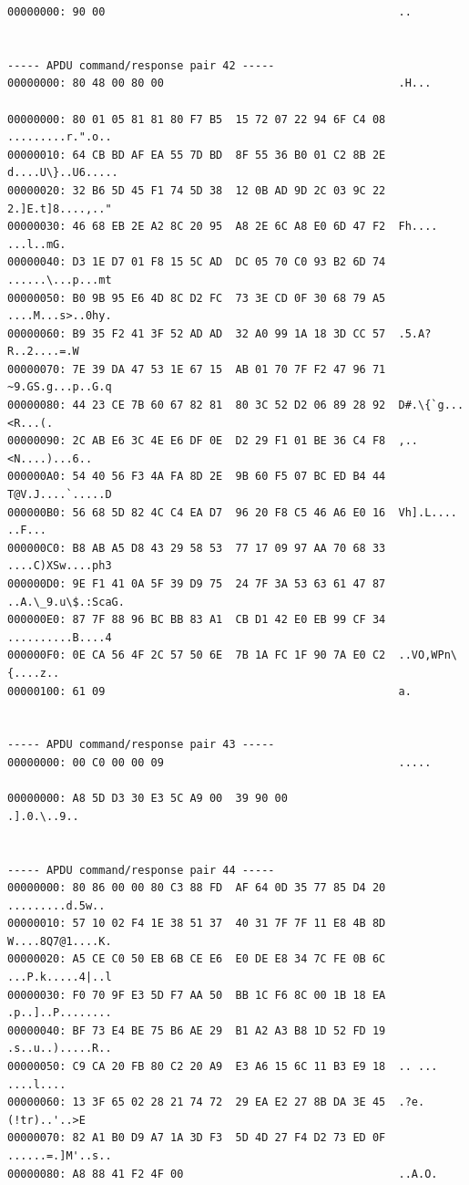 \documentclass[bsc,frontabs,twoside,singlespacing,parskip,deptreport]{infthesis}     %
\begin{document}
\begin{appendices}
\begin{Verbatim}[commandchars=\\\{\}, fontsize=\small]
00000000: 90 00                                             ..


----- APDU command/response pair 42 -----
00000000: 80 48 00 80 00                                    .H...

00000000: 80 01 05 81 81 80 F7 B5  15 72 07 22 94 6F C4 08  .........r.".o..
00000010: 64 CB BD AF EA 55 7D BD  8F 55 36 B0 01 C2 8B 2E  d....U\}..U6.....
00000020: 32 B6 5D 45 F1 74 5D 38  12 0B AD 9D 2C 03 9C 22  2.]E.t]8....,.."
00000030: 46 68 EB 2E A2 8C 20 95  A8 2E 6C A8 E0 6D 47 F2  Fh.... ...l..mG.
00000040: D3 1E D7 01 F8 15 5C AD  DC 05 70 C0 93 B2 6D 74  ......\...p...mt
00000050: B0 9B 95 E6 4D 8C D2 FC  73 3E CD 0F 30 68 79 A5  ....M...s>..0hy.
00000060: B9 35 F2 41 3F 52 AD AD  32 A0 99 1A 18 3D CC 57  .5.A?R..2....=.W
00000070: 7E 39 DA 47 53 1E 67 15  AB 01 70 7F F2 47 96 71  ~9.GS.g...p..G.q
00000080: 44 23 CE 7B 60 67 82 81  80 3C 52 D2 06 89 28 92  D#.\{`g...<R...(.
00000090: 2C AB E6 3C 4E E6 DF 0E  D2 29 F1 01 BE 36 C4 F8  ,..<N....)...6..
000000A0: 54 40 56 F3 4A FA 8D 2E  9B 60 F5 07 BC ED B4 44  T@V.J....`.....D
000000B0: 56 68 5D 82 4C C4 EA D7  96 20 F8 C5 46 A6 E0 16  Vh].L.... ..F...
000000C0: B8 AB A5 D8 43 29 58 53  77 17 09 97 AA 70 68 33  ....C)XSw....ph3
000000D0: 9E F1 41 0A 5F 39 D9 75  24 7F 3A 53 63 61 47 87  ..A.\_9.u\$.:ScaG.
000000E0: 87 7F 88 96 BC BB 83 A1  CB D1 42 E0 EB 99 CF 34  ..........B....4
000000F0: 0E CA 56 4F 2C 57 50 6E  7B 1A FC 1F 90 7A E0 C2  ..VO,WPn\{....z..
00000100: 61 09                                             a.


----- APDU command/response pair 43 -----
00000000: 00 C0 00 00 09                                    .....

00000000: A8 5D D3 30 E3 5C A9 00  39 90 00                 .].0.\..9..


----- APDU command/response pair 44 -----
00000000: 80 86 00 00 80 C3 88 FD  AF 64 0D 35 77 85 D4 20  .........d.5w.. 
00000010: 57 10 02 F4 1E 38 51 37  40 31 7F 7F 11 E8 4B 8D  W....8Q7@1....K.
00000020: A5 CE C0 50 EB 6B CE E6  E0 DE E8 34 7C FE 0B 6C  ...P.k.....4|..l
00000030: F0 70 9F E3 5D F7 AA 50  BB 1C F6 8C 00 1B 18 EA  .p..]..P........
00000040: BF 73 E4 BE 75 B6 AE 29  B1 A2 A3 B8 1D 52 FD 19  .s..u..).....R..
00000050: C9 CA 20 FB 80 C2 20 A9  E3 A6 15 6C 11 B3 E9 18  .. ... ....l....
00000060: 13 3F 65 02 28 21 74 72  29 EA E2 27 8B DA 3E 45  .?e.(!tr)..'..>E
00000070: 82 A1 B0 D9 A7 1A 3D F3  5D 4D 27 F4 D2 73 ED 0F  ......=.]M'..s..
00000080: A8 88 41 F2 4F 00                                 ..A.O.


\end{Verbatim}
\end{appendices}
\end{document}
